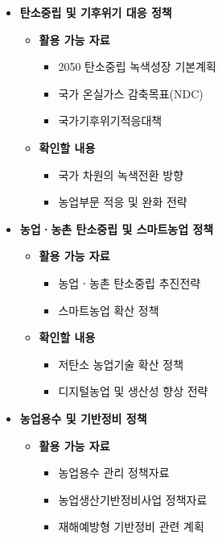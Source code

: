 \begin{itemize}

    \item \textbf{탄소중립 및 기후위기 대응 정책}

    \begin{itemize}
        \item \textbf{활용 가능 자료}
        \begin{itemize}
            \item 2050 탄소중립 녹색성장 기본계획
            \item 국가 온실가스 감축목표(NDC)
            \item 국가기후위기적응대책
        \end{itemize}

        \item \textbf{확인할 내용}
        \begin{itemize}
            \item 국가 차원의 녹색전환 방향
            \item 농업부문 적응 및 완화 전략
        \end{itemize}
    \end{itemize}

    \item \textbf{농업ㆍ농촌 탄소중립 및 스마트농업 정책}

    \begin{itemize}
        \item \textbf{활용 가능 자료}
        \begin{itemize}
            \item 농업ㆍ농촌 탄소중립 추진전략
            \item 스마트농업 확산 정책
        \end{itemize}

        \item \textbf{확인할 내용}
        \begin{itemize}
            \item 저탄소 농업기술 확산 정책
            \item 디지털농업 및 생산성 향상 전략
        \end{itemize}
    \end{itemize}

    \item \textbf{농업용수 및 기반정비 정책}

    \begin{itemize}
        \item \textbf{활용 가능 자료}
        \begin{itemize}
            \item 농업용수 관리 정책자료
            \item 농업생산기반정비사업 정책자료
            \item 재해예방형 기반정비 관련 계획
        \end{itemize}


\end{itemize}
\end{itemize}

